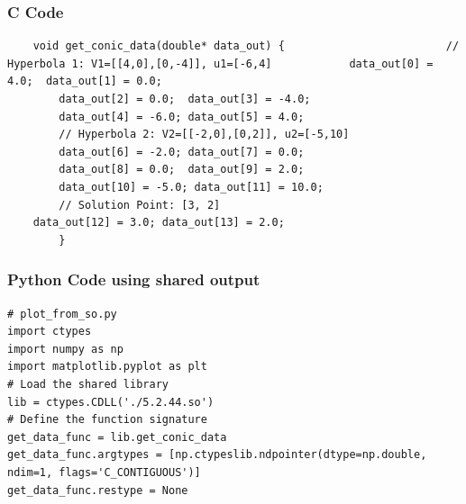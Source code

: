 \documentclass{beamer}
\begin{document}
	\begin{frame}[fragile]
		\frametitle{C Code}
		
		\begin{lstlisting}
	void get_conic_data(double* data_out) {							// Hyperbola 1: V1=[[4,0],[0,-4]], u1=[-6,4]			data_out[0] = 4.0;  data_out[1] = 0.0;
		data_out[2] = 0.0;  data_out[3] = -4.0;
		data_out[4] = -6.0; data_out[5] = 4.0;
		// Hyperbola 2: V2=[[-2,0],[0,2]], u2=[-5,10]
		data_out[6] = -2.0; data_out[7] = 0.0;
		data_out[8] = 0.0;  data_out[9] = 2.0;
		data_out[10] = -5.0; data_out[11] = 10.0;
		// Solution Point: [3, 2]
	data_out[12] = 3.0; data_out[13] = 2.0;
		}
		\end{lstlisting}
	\end{frame}
	\begin{frame}[fragile]
		\frametitle{Python Code using shared output}
		
		\begin{lstlisting}
# plot_from_so.py
import ctypes
import numpy as np
import matplotlib.pyplot as plt
# Load the shared library
lib = ctypes.CDLL('./5.2.44.so')
# Define the function signature
get_data_func = lib.get_conic_data
get_data_func.argtypes = [np.ctypeslib.ndpointer(dtype=np.double, ndim=1, flags='C_CONTIGUOUS')]
get_data_func.restype = None		
		\end{lstlisting}
	\end{frame}
\end{document}
